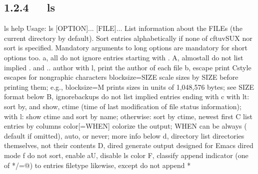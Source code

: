 \documentclass[letterpaper,12pt,english]{sphinxmanual}
\begin{document}
\subsection{1.2.4   ls}
\label{\detokenize{001software/001install/linux:ls}}
\begin{sphinxVerbatim}[commandchars=\\\{\}]
\PYGZdl{} ls \PYGZhy{}\PYGZhy{}help
Usage: ls [OPTION]... [FILE]...
List information about the FILEs (the current directory by default).
Sort entries alphabetically if none of \PYGZhy{}cftuvSUX nor \PYGZhy{}\PYGZhy{}sort is specified.
Mandatory arguments to long options are mandatory for short options too.
  \PYGZhy{}a, \PYGZhy{}\PYGZhy{}all                  do not ignore entries starting with .
  \PYGZhy{}A, \PYGZhy{}\PYGZhy{}almost\PYGZhy{}all           do not list implied . and ..
      \PYGZhy{}\PYGZhy{}author               with \PYGZhy{}l, print the author of each file
  \PYGZhy{}b, \PYGZhy{}\PYGZhy{}escape               print C\PYGZhy{}style escapes for nongraphic   characters
      \PYGZhy{}\PYGZhy{}block\PYGZhy{}size=SIZE      scale sizes by SIZE before printing them;   e.g.,
                               \PYGZsq{}\PYGZhy{}\PYGZhy{}block\PYGZhy{}size=M\PYGZsq{} prints sizes in units of
                               1,048,576 bytes; see SIZE format below
  \PYGZhy{}B, \PYGZhy{}\PYGZhy{}ignore\PYGZhy{}backups       do not list implied entries ending with \PYGZti{}
  \PYGZhy{}c                         with \PYGZhy{}lt: sort by, and show, ctime (time of   last
                               modification of file status information);
                               with \PYGZhy{}l: show ctime and sort by name;
                               otherwise: sort by ctime, newest first
  \PYGZhy{}C                         list entries by columns
      \PYGZhy{}\PYGZhy{}color[=WHEN]         colorize the output; WHEN can be \PYGZsq{}always\PYGZsq{} (  default
                               if omitted), \PYGZsq{}auto\PYGZsq{}, or \PYGZsq{}never\PYGZsq{}; more info   below
  \PYGZhy{}d, \PYGZhy{}\PYGZhy{}directory            list directories themselves, not their   contents
  \PYGZhy{}D, \PYGZhy{}\PYGZhy{}dired                generate output designed for Emacs\PYGZsq{} dired   mode
  \PYGZhy{}f                         do not sort, enable \PYGZhy{}aU, disable \PYGZhy{}ls \PYGZhy{}\PYGZhy{}color
  \PYGZhy{}F, \PYGZhy{}\PYGZhy{}classify             append indicator (one of */=\PYGZgt{}@\textbar{}) to entries
      \PYGZhy{}\PYGZhy{}file\PYGZhy{}type            likewise, except do not append \PYGZsq{}*\PYGZsq{}

\end{sphinxVerbatim}
\end{document}
